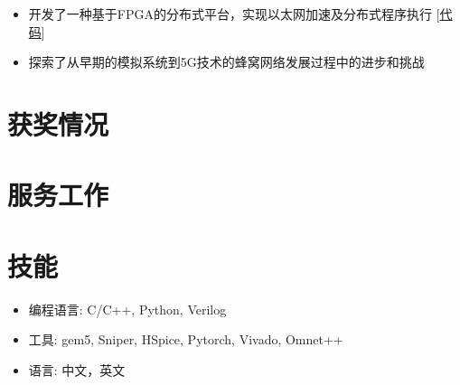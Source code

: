 \documentclass{resume}
\begin{document}
\vspace{-8pt}
\begin{itemize}
  \item 开发了一种基于FPGA的分布式平台，实现以太网加速及分布式程序执行 [\href{https://github.com/jingyao-zhang/XSC_Distributed_Platform_for_Acceleration}{代码}]
\end{itemize}

\vspace{-8pt}
\begin{itemize}
  \item 探索了从早期的模拟系统到5G技术的蜂窝网络发展过程中的进步和挑战
\end{itemize}

\section{获奖情况}

\section{服务工作}

\section{技能}
\begin{itemize}[parsep=0.5ex]
  \item 编程语言: C/C++, Python, Verilog
  \item 工具: gem5, Sniper, HSpice, Pytorch, Vivado, Omnet++
  \item 语言: 中文，英文
\end{itemize}


%
%
\end{document}
